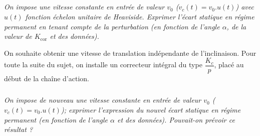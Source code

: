 \documentclass[10pt,fleqn]{article} %
\begin{document}
\subparagraph{}
\textit{On impose une vitesse constante en entrée de valeur $v_0$ ($v_c(t)=v_0.u(t)$) avec $u(t)$ fonction échelon unitaire de Heaviside. Exprimer l’écart statique en régime permanent en tenant compte de la perturbation (en fonction de l’angle $\alpha$, de la valeur de $K_{\text{cor}}$ et des données).}
\ifprof
\begin{corrige}
\end{corrige}
\else
\fi

\vspace{.25cm}

On souhaite obtenir une vitesse de translation indépendante de l’inclinaison. Pour toute la suite du sujet, on installe un correcteur intégral du type $\dfrac{K_c}{p}$, placé au début de la chaîne d’action.

\subparagraph{}
\textit{On impose de nouveau une vitesse constante en entrée de valeur $v_0$ ($v_c(t)=v_0.u(t)$); exprimer l’expression du nouvel écart statique en régime permanent (en fonction de l’angle $\alpha$ et des données). Pouvait-on prévoir ce résultat ?}
\ifprof
\begin{corrige}
\end{corrige}
\else
\fi


%
%
%
%
\end{document}
